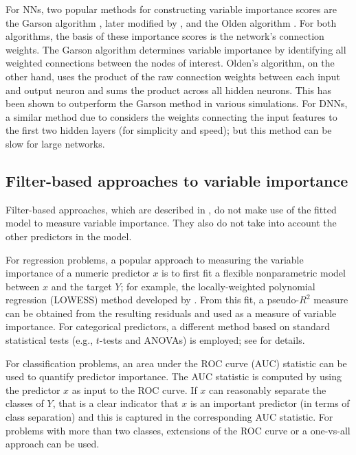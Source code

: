 \documentclass[12pt]{article}
\begin{document}
For NNs, two popular methods for constructing variable importance scores are the Garson algorithm \citep{interpreting-garson-1991}, later modified by \citet{back-goh-1995}, and the Olden algorithm \citep{accurate-olden-2004}. For both algorithms, the basis of these importance scores is the network's connection weights. The Garson algorithm determines variable importance by identifying all weighted connections between the nodes of interest. Olden's algorithm, on the other hand, uses the product of the raw connection weights between each input and output neuron and sums the product across all hidden neurons. This has been shown to outperform the Garson method in various simulations. For DNNs, a similar method due to \citet{data-gedeon-1997} considers the weights connecting the input features to the first two hidden layers (for simplicity and speed); but this method can be slow for large networks.


\subsection{Filter-based approaches to variable importance}

Filter-based approaches, which are described in \citet[chap. 18]{applied-kuhn-2013}, do not make use of the fitted model to measure variable importance. They also do not take into account the other predictors in the model.

For regression problems, a popular approach to measuring the variable importance of a numeric predictor $x$ is to first fit a flexible nonparametric model between $x$ and the target $Y$; for example, the locally-weighted polynomial regression (LOWESS) method developed by \citet{robust-cleveland-1979}. From this fit, a pseudo-$R^2$ measure can be obtained from the resulting residuals and used as a measure of variable importance. For categorical predictors, a different method based on standard statistical tests (e.g., $t$-tests and ANOVAs) is employed; see \citet[chap. 18]{applied-kuhn-2013} for details.

For classification problems, an area under the ROC curve (AUC) statistic can be used to quantify predictor importance. The AUC statistic is computed by using the predictor $x$ as input to the ROC curve. If $x$ can reasonably separate the classes of $Y$, that is a clear indicator that $x$ is an important predictor (in terms of class separation) and this is captured in the corresponding AUC statistic. For problems with more than two classes, extensions of the ROC curve or a one-vs-all approach can be used.
\end{document}
